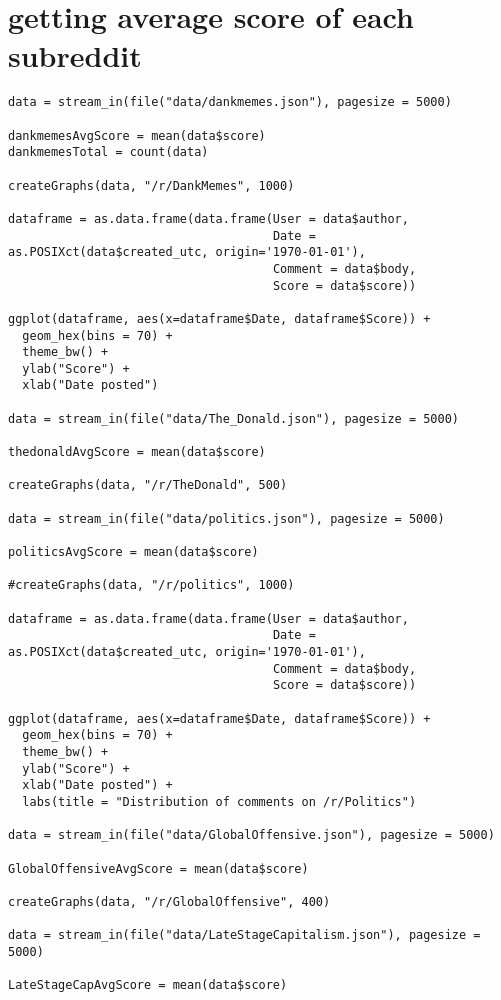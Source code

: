 \section{getting average score of each subreddit}
\label{sec:AppendexAvgs}
\begin{lstlisting}
data = stream_in(file("data/dankmemes.json"), pagesize = 5000)

dankmemesAvgScore = mean(data$score)
dankmemesTotal = count(data)

createGraphs(data, "/r/DankMemes", 1000)

dataframe = as.data.frame(data.frame(User = data$author, 
                                     Date = as.POSIXct(data$created_utc, origin='1970-01-01'), 
                                     Comment = data$body,
                                     Score = data$score))

ggplot(dataframe, aes(x=dataframe$Date, dataframe$Score)) +
  geom_hex(bins = 70) +
  theme_bw() +
  ylab("Score") +
  xlab("Date posted")

data = stream_in(file("data/The_Donald.json"), pagesize = 5000)

thedonaldAvgScore = mean(data$score)

createGraphs(data, "/r/TheDonald", 500)

data = stream_in(file("data/politics.json"), pagesize = 5000)

politicsAvgScore = mean(data$score)

#createGraphs(data, "/r/politics", 1000)

dataframe = as.data.frame(data.frame(User = data$author, 
                                     Date = as.POSIXct(data$created_utc, origin='1970-01-01'), 
                                     Comment = data$body,
                                     Score = data$score))

ggplot(dataframe, aes(x=dataframe$Date, dataframe$Score)) +
  geom_hex(bins = 70) +
  theme_bw() +
  ylab("Score") +
  xlab("Date posted") +
  labs(title = "Distribution of comments on /r/Politics")

data = stream_in(file("data/GlobalOffensive.json"), pagesize = 5000)

GlobalOffensiveAvgScore = mean(data$score)

createGraphs(data, "/r/GlobalOffensive", 400)

data = stream_in(file("data/LateStageCapitalism.json"), pagesize = 5000)

LateStageCapAvgScore = mean(data$score)


\end{lstlisting}
